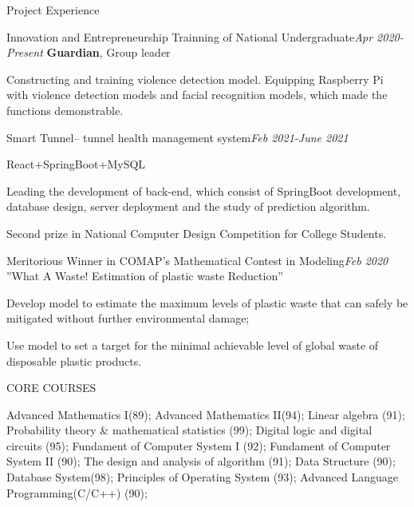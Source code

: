 \documentclass{resume} %
\begin{document}
\begin{rSection}{Project Experience}

\begin{rSubsection}{Innovation and Entrepreneurship Trainning of National Undergraduate}{\emph{Apr 2020-Present}}
{\textbf{Guardian}, Group leader}
{}
{}
 \item Constructing and training violence detection model. Equipping Raspberry Pi with violence detection
models and facial recognition models, which made the functions demonstrable.
\end{rSubsection}

\begin{rSubsection}{Smart Tunnel-- tunnel health management system}{\emph{Feb 2021-June 2021}}
{}
{}
{}
 \item React+SpringBoot+MySQL
 \item Leading the development of back-end, which consist of SpringBoot development, database design,
server deployment and the study of prediction algorithm.
\item Second prize in National Computer Design Competition for College Students.
\end{rSubsection}

\begin{rSubsection}{Meritorious Winner in COMAP’s Mathematical Contest in Modeling}{\emph{Feb 2020}}
{”What A Waste! Estimation of plastic waste Reduction”}
{}
{}
 \item Develop model to estimate the maximum levels of plastic waste that can safely be mitigated without further environmental damage;
 \item Use model to set a target for the minimal achievable level of global waste of disposable plastic products.
\end{rSubsection}

\end{rSection}

\begin{rSection}{CORE COURSES}
\item Advanced Mathematics I(89); Advanced Mathematics II(94); Linear algebra (91); Probability theory \&
mathematical statistics (99); Digital logic and digital circuits (95); Fundament of Computer System I (92);
Fundament of Computer System II (90); The design and analysis of algorithm (91); Data Structure (90);
Database System(98); Principles of Operating System (93); Advanced Language Programming(C/C++)
(90);
\end{rSection}


\end{document}
